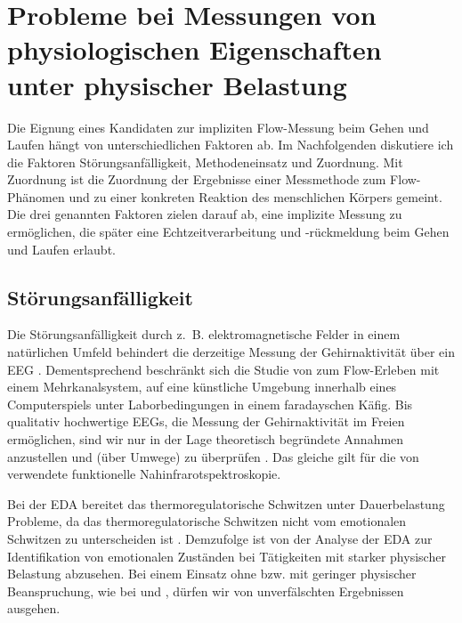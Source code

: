
\section{Probleme bei Messungen von physiologischen Eigenschaften unter physischer Belastung} %
\label{sec:probleme_bei_messungen}

Die Eignung eines Kandidaten zur impliziten Flow-Messung beim Gehen und Laufen hängt von unterschiedlichen Faktoren ab. Im Nachfolgenden diskutiere ich die Faktoren Störungsanfälligkeit, Methodeneinsatz und Zuordnung. Mit Zuordnung ist die Zuordnung der Ergebnisse einer Messmethode zum Flow-Phänomen und zu einer konkreten Reaktion des menschlichen Körpers gemeint. Die drei genannten Faktoren zielen darauf ab, eine implizite Messung zu ermöglichen, die später eine Echtzeitverarbeitung und -rückmeldung beim Gehen und Laufen erlaubt.

\subsection{Störungsanfälligkeit} %
\label{sub:storungsanfalligkeit}

Die Störungsanfälligkeit durch z.~B. elektromagnetische Felder in einem natürlichen Umfeld behindert die derzeitige Messung der Gehirnaktivität über ein \ac{EEG} \citep[][S.~56]{Henk2014}. Dementsprechend beschränkt sich die Studie von \citet{Hugentobler2011} zum Flow-Erleben mit einem Mehrkanalsystem, auf eine künstliche Umgebung innerhalb eines Computerspiels unter Laborbedingungen in einem faradayschen Käfig. Bis qualitativ hochwertige \acp{EEG}, die Messung der Gehirnaktivität im Freien ermöglichen, sind wir nur in der Lage theoretisch begründete Annahmen anzustellen und (über Umwege) zu überprüfen \citep[][S.~56]{Henk2014}. Das gleiche gilt für die von \citet{Harmat2015} verwendete funktionelle Nahinfrarotspektroskopie.

Bei der \ac{EDA} bereitet das thermoregulatorische Schwitzen unter Dauerbelastung Probleme, da das thermoregulatorische Schwitzen nicht vom emotionalen Schwitzen zu unterscheiden ist \citep{Baumeister2009}. Demzufolge ist von der Analyse der \ac{EDA} zur Identifikation von emotionalen Zuständen bei Tätigkeiten mit starker physischer Belastung abzusehen. Bei einem Einsatz ohne bzw. mit geringer physischer Beanspruchung, wie bei \citet{Kivikangas2006} und \citet{Nacke2008}, dürfen wir von unverfälschten Ergebnissen ausgehen.

